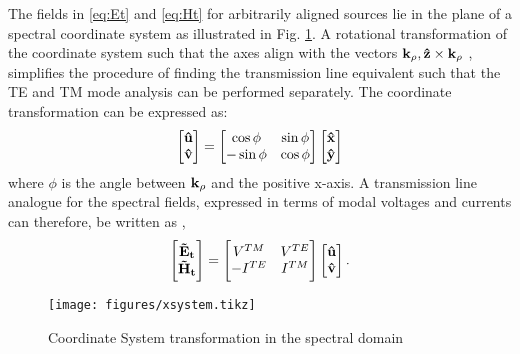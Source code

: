 \documentclass[11pt]{article}
\begin{document}
The fields in \eqref{eq:Et} and  \eqref{eq:Ht} for arbitrarily aligned sources lie in the plane of a spectral coordinate system as illustrated in Fig. \ref{fig:SpCS}. A rotational transformation of the coordinate system such that the axes align with the vectors $\mathbf{k_{\rho}}, \mathbf{\hat z} \times \mathbf{k_{\rho}}$ \cite{itoh1980}, simplifies the procedure of finding the transmission line equivalent such that the TE and TM mode analysis can be performed separately. The coordinate transformation can be expressed as:
%
\begin{equation}
  \begin{bmatrix}
    \mathbf{\hat u} \\
    \mathbf{\hat v}
  \end{bmatrix}
  =
  \begin{bmatrix}
    \cos \phi & \sin \phi \\
    -\sin \phi & \cos \phi
  \end{bmatrix}
  \begin{bmatrix}
    \mathbf{\hat x} \\
    \mathbf{\hat y}
  \end{bmatrix}
  \label{eq:transformation}
\end{equation}
%
where $\phi$ is the angle between $\mathbf{k_{\rho}}$ and the positive x-axis. A transmission line analogue for the spectral fields, expressed in terms of modal voltages and currents can therefore, be written as \cite{kastner1988, michalski1997multilayered},
%
\begin{equation}
  \begin{bmatrix}
    \mathbf{\tilde{E}_t} \\
    \mathbf{\tilde{H}_t}
  \end{bmatrix}
  =
  \begin{bmatrix}
    V^{TM} & V^{TE} \\
    -I^{TE} & I^{TM}
  \end{bmatrix}
  \begin{bmatrix}
    \mathbf{\hat u} \\
    \mathbf{\hat v}
  \end{bmatrix}.
  \label{eq:EHVI}
\end{equation}
%
\begin{figure}[t!]
  \centering
  \texttt{[image: figures/xsystem.tikz]}
  \caption{Coordinate System transformation in the spectral domain}
  \label{fig:SpCS}
\end{figure}
\end{document}
